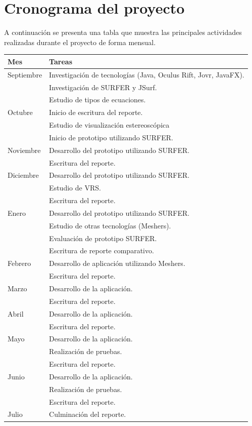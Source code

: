 \documentclass[12pt]{article}
\begin{document}
\section{Cronograma del proyecto}
A continuación se presenta una tabla que muestra las principales actividades realizadas durante el proyecto de forma mensual.
\begin{center}
    \begin{tabular}{ | l | p{9cm} |}
    \hline
    Mes &   Tareas \\ \hline
    Septiembre &  Investigación de tecnologías (Java, Oculus Rift, Jovr, JavaFX).\\ & Investigación de SURFER y JSurf. \\ & Estudio de tipos de ecuaciones.\\ \hline
    Octubre &  Inicio de escritura del reporte. \\ & Estudio de visualización estereoscópica \\ & Inicio de prototipo utilizando SURFER. \\ \hline
    Noviembre &  Desarrollo del prototipo utilizando SURFER.\\ & Escritura del reporte. \\ \hline
    Diciembre &  Desarrollo del prototipo utilizando SURFER.\\ & Estudio de VRS.\\ & Escritura del reporte. \\ \hline
    Enero &   Desarrollo del prototipo utilizando SURFER.\\ & Estudio de otras tecnologías (Meshers).\\ &  Evaluación de prototipo SURFER.\\ & Escritura de reporte comparativo.\\ \hline
    Febrero  & Desarrollo de aplicación utilizando Meshers. \\ & Escritura del reporte. \\ \hline
    Marzo &  Desarrollo de la aplicación.\\ & Escritura del reporte. \\ \hline
    Abril &  Desarrollo de la aplicación.\\ & Escritura del reporte. \\ \hline
    Mayo &  Desarrollo de la aplicación.\\ &  Realización de pruebas.\\ & Escritura del reporte. \\ \hline
    Junio &  Desarrollo de la aplicación.\\ &  Realización de pruebas.\\ & Escritura del reporte. \\ \hline
    Julio & Culminación del reporte. \\ \hline
    \hline
    \end{tabular}
\end{center}
\clearpage
\null\newpage
\end{document}
